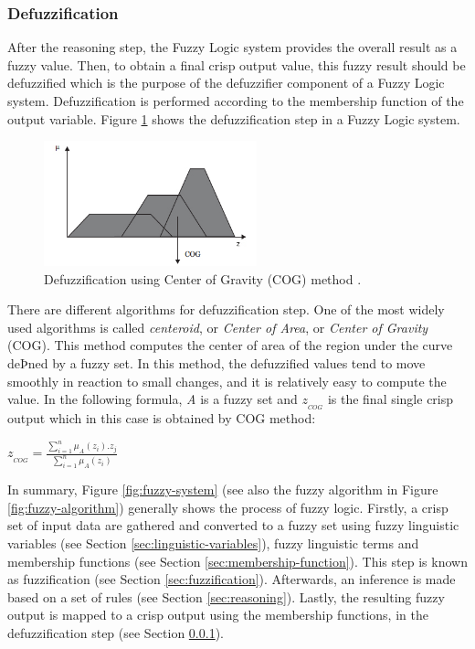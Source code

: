 \documentclass[11pt]{article}
\begin{document}
\subsubsection{Defuzzification}
\label{sec:defuzzification}

After the reasoning step, the Fuzzy Logic system provides the overall result as
a fuzzy value. Then, to obtain a final crisp output value, this fuzzy result
should be defuzzified which is the purpose of the defuzzifier component of a
Fuzzy Logic system. Defuzzification is performed according to the membership
function of the output variable. Figure \ref{fig:defuzzification} shows the
defuzzification step in a Fuzzy Logic system.

\begin{figure}[tbh]
  \center
  \includegraphics[width=0.55\textwidth]{figure/cog.png}
  \caption{Defuzzification using Center of Gravity (COG) method
  \cite{antonio:cog-defuzzification}.}
  \label{fig:defuzzification}
\end{figure}

There are different algorithms for defuzzification step. One of the most
widely used algorithms is called \textit{centeroid}, or \textit{Center of
Area}, or \textit{Center of Gravity} (COG). This method computes the center of
area of the region under the curve deÞned by a fuzzy set. In this method, the
defuzzified values tend to move smoothly in reaction to small changes, and it is
relatively easy to compute the value. In the following formula, \textit{A} is
a fuzzy set and $z_{_{COG}}$ is the final single crisp output which in this case
is obtained by COG method:\\

\begin{center}
$z_{_{COG}} = \frac{\sum\limits_{i=1}^{n} \mu_A(z_i).z_j}{\sum\limits_{i=1}^{n}
\mu_A(z_i)}$
\end{center}

In summary, Figure \ref{fig:fuzzy-system} (see also the fuzzy algorithm in
Figure \ref{fig:fuzzy-algorithm}) generally shows the process of fuzzy logic.
Firstly, a crisp set of input data are gathered and converted to a fuzzy set
using fuzzy linguistic variables (see Section \ref{sec:linguistic-variables}),
fuzzy linguistic terms and membership functions (see Section
\ref{sec:membership-function}). This step is known as fuzzification (see
Section \ref{sec:fuzzification}). Afterwards, an inference is made based on a
set of rules (see Section \ref{sec:reasoning}). Lastly, the resulting fuzzy
output is mapped to a crisp output using the membership functions, in the
defuzzification step (see Section \ref{sec:defuzzification}).
\end{document}
